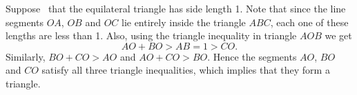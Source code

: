 Suppose \wlg\ that the equilateral triangle has side length 1. Note that since the line segments $OA$, $OB$ and $OC$ lie entirely inside the triangle $ABC$, each one of these lengths are less than 1. Also, using the triangle inequality in triangle $AOB$ we get 
$$AO+BO > AB = 1 > CO.$$
Similarly, $BO + CO > AO$ and $AO+CO > BO$. Hence the segments $AO$, $BO$ and $CO$ satisfy all three triangle inequalities, which implies that they form a triangle. 

